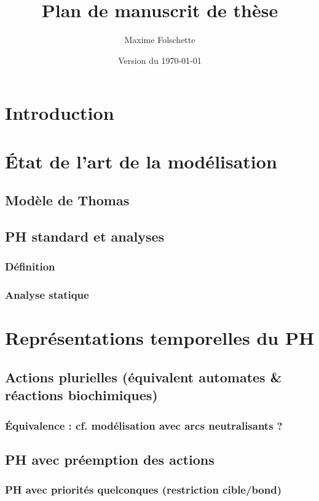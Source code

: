 \documentclass[a4paper]{report}
\author{Maxime Folschette}
\title{Plan de manuscrit de thèse}
\date{Version du \today}
\begin{document}
\setcounter{tocdepth}{3}
\tableofcontents



\chapter{Introduction}

\chapter{État de l'art de la modélisation}
  \section{Modèle de Thomas}
  \section{PH standard et analyses}
    \subsection{Définition}
    \subsection{Analyse statique}

\chapter{Représentations temporelles du PH}
  \section{Actions plurielles (équivalent automates \& réactions biochimiques)}
    \subsection{Équivalence : cf. modélisation avec arcs neutralisants ?}
  \section{PH avec préemption des actions}
    \subsection{PH avec priorités quelconques (restriction cible/bond)}
\end{document}

